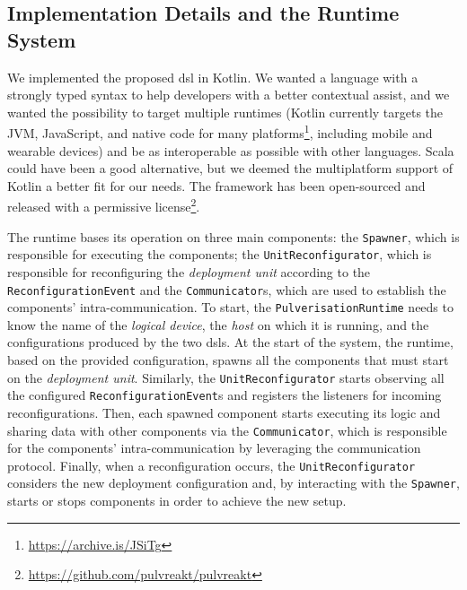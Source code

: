 \documentclass[conference]{IEEEtran}
\begin{document}
% 

\subsection{Implementation Details and the Runtime System}
\label{sec:contrib:runtime}

We implemented the proposed \ac{dsl} in Kotlin.
%
We wanted a language with a strongly typed syntax to help developers with a better contextual assist,
and we wanted the possibility to target multiple runtimes
(Kotlin currently targets the JVM, JavaScript, and native code for many platforms\footnote{\url{https://archive.is/JSiTg}},
including mobile and wearable devices)
and be as interoperable as possible with other languages.
%
Scala could have been a good alternative,
but we deemed the multiplatform support of Kotlin a better fit for our needs.
%
The framework has been open-sourced and released with a permissive license\footnote{\url{https://github.com/pulvreakt/pulvreakt}}.

The runtime bases its operation on three main components:
the \texttt{Spawner}, which is responsible for executing the components;
the \texttt{UnitReconfigurator}, which is responsible for reconfiguring the \emph{deployment unit}
according to the \texttt{ReconfigurationEvent}
and the \texttt{Communicator}s,
which are used to establish the components' intra-communication.
%
To start, the \texttt{PulverisationRuntime} needs to know the name of the \emph{logical device},
the \emph{host} on which it is running, and the configurations produced by the two \ac{dsl}s.
%
At the start of the system, the runtime,
based on the provided configuration,
spawns all the components that must start on the \emph{deployment unit}.
%
Similarly, the \texttt{UnitReconfigurator} starts observing all the configured \texttt{ReconfigurationEvent}s
and registers the listeners for incoming reconfigurations.
%
Then,
each spawned component starts
executing its logic and sharing data with other components via the \texttt{Communicator},
which is responsible for the components' intra-communication by leveraging the communication protocol.
%
Finally,
when a reconfiguration occurs, the \texttt{UnitReconfigurator} considers the new deployment configuration and,
by interacting with the \texttt{Spawner},
starts or stops components in order to achieve the new setup.
\end{document}
